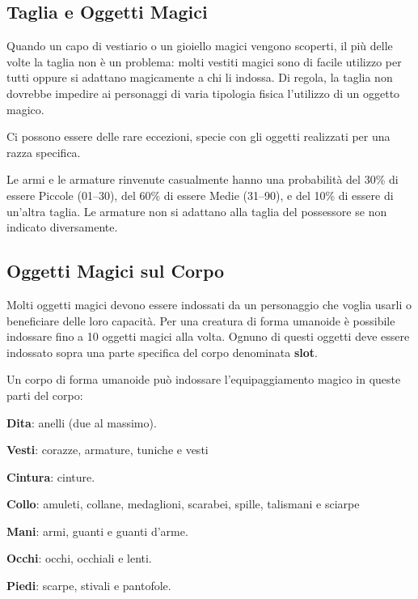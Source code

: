 \begin{multicols}{2}
\subsection{Taglia e Oggetti Magici}\label{tagliaoggettimagici}

\label{taglia-e-oggetti-magici}

Quando un capo di vestiario o un gioiello magici vengono scoperti, il più delle volte la taglia non è un problema: molti vestiti magici sono di facile utilizzo per tutti oppure si adattano magicamente a chi li indossa. Di regola, la taglia non dovrebbe impedire ai personaggi di varia tipologia fisica l'utilizzo di un oggetto magico.

Ci possono essere delle rare eccezioni, specie con gli oggetti realizzati per una razza specifica.

Le armi e le armature rinvenute casualmente hanno una probabilità del 30\% di essere Piccole (01--30), del 60\% di essere Medie (31--90), e del 10\% di essere di un'altra taglia. Le armature non si adattano alla taglia del possessore se non indicato diversamente.

\subsection{Oggetti Magici sul Corpo}

\label{oggetti-magici-sul-corpo}

Molti oggetti magici devono essere indossati da un personaggio che voglia usarli o beneficiare delle loro capacità. Per una creatura di forma umanoide è possibile indossare fino a 10 oggetti magici alla volta. Ognuno di questi oggetti deve essere indossato sopra una parte specifica del corpo denominata \textbf{slot}.

Un corpo di forma umanoide può indossare l'equipaggiamento magico in queste parti del corpo:

\textbf{Dita}: anelli (due al massimo).

\textbf{Vesti}: corazze, armature, tuniche e vesti

\textbf{Cintura}: cinture.

\textbf{Collo}: amuleti, collane, medaglioni, scarabei, spille, talismani e sciarpe

\textbf{Mani}: armi, guanti e guanti d'arme.

\textbf{Occhi}: occhi, occhiali e lenti.

\textbf{Piedi}: scarpe, stivali e pantofole.


\end{multicols}
